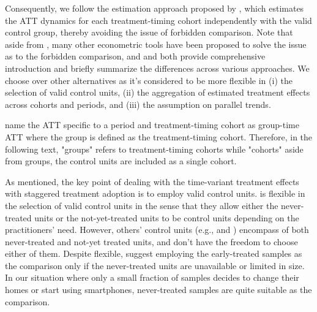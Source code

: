 Consequently, we follow the estimation approach proposed by \cite{callaway2021difference}, which estimates the ATT dynamics for each treatment-timing cohort independently with the valid control group, thereby avoiding the issue of forbidden comparison.
Note that aside from \cite{callaway2021difference}, many other econometric tools have been proposed to solve the issue as to the forbidden comparison, and \cite{roth2023s} and \cite{de2023two} both provide comprehensive introduction and briefly summarize the differences across various approaches.
We choose \cite{callaway2021difference} over other alternatives as it's considered to be more flexible in (i) the selection of valid control units, (ii) the aggregation of estimated treatment effects across cohorts and periods, and (iii) the assumption on parallel trends.



\cite{callaway2021difference} name the ATT specific to a period and treatment-timing cohort as group-time ATT where the group is defined as the treatment-timing cohort.
Therefore, in the following text, "groups" refers to treatment-timing cohorts while "cohorts" aside from groups, the control units are included as a single cohort.

As mentioned, the key point of dealing with the time-variant treatment effects with staggered treatment adoption is to employ valid control units.
\cite{callaway2021difference} is flexible in the selection of valid control units in the sense that they allow either the never-treated units or the not-yet-treated units to be control units depending on the practitioners' need. However, others' control units (e.g., \cite{sun2021estimating} and \cite{borusyak2024revisiting}) encompass of both never-treated and not-yet treated units, and don't have the freedom to choose either of them. Despite flexible, \cite{callaway2021difference} suggest employing the early-treated samples as the comparison only if the never-treated units are unavailable or limited in size. In our situation where only a small fraction of samples decides to change their homes or start using smartphones, never-treated samples are quite suitable as the comparison.

